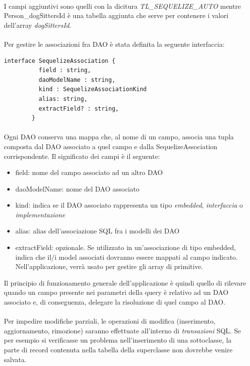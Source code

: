 \documentclass[a4paper, 12pt]{report}
\begin{document}
      \paragraph*{}
      I campi aggiuntivi sono quelli con la dicitura \emph{TL_SEQUELIZE_AUTO} mentre Person_dogSittersId è una tabella aggiunta che serve per contenere i valori dell'array \emph{dogSittersId}.
      \paragraph*{}
      Per gestire le associazioni fra DAO è stata definita la seguente interfaccia:
      \begin{Verbatim}[samepage=true]
        interface SequelizeAssociation {
          field : string,
          daoModelName : string,
          kind : SequelizeAssociationKind
          alias: string,
          extractField? : string,
        }
      \end{Verbatim}
      \paragraph*{}
      Ogni DAO conserva una mappa che, al nome di un campo, associa una tupla composta dal DAO associato a quel campo e dalla SequelizeAssociation corrispondente.
      Il significato dei campi è il seguente:
      \begin{itemize}
        \item field: nome del campo associato ad un altro DAO
        \item daoModelName: nome del DAO associato
        \item kind: indica se il DAO associato rappresenta un tipo \emph{embedded}, \emph{interfaccia} o \emph{implementazione}
        \item alias: alias dell'associazione SQL fra i modelli dei DAO
        \item extractField: opzionale. Se utilizzato in un'associazione di tipo embedded, indica che il/i model associati dovranno essere mappati al campo indicato.
                            Nell'applicazione, verrà usato per gestire gli array di primitive.
      \end{itemize}
      Il principio di funzionamento generale dell'applicazione è quindi quello di rilevare quando un campo presente nei parametri della query è relativo ad un DAO associato e, di conseguenza, delegare la risoluzione di quel campo al DAO.
      \paragraph*{}
      Per impedire modifiche parziali, le operazioni di modifica (inserimento, aggiornamento, rimozione) saranno effettuate all'interno di \emph{transazioni} SQL.
      Se per esempio si verificasse un problema nell'inserimento di una sottoclasse, la parte di record contenuta nella tabella della superclasse non dovrebbe venire salvata.
\end{document}

